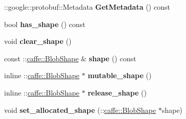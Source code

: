 \begin{DoxyCompactItemize}
\+::google\+::protobuf\+::\+Metadata {\bfseries Get\+Metadata} () const
\item 
\mbox{\label{classcaffe_1_1_parameter_parameter_a061bdee3f3dcfa3fb1695c45480bbbef}} 
bool {\bfseries has\+\_\+shape} () const
\item 
\mbox{\label{classcaffe_1_1_parameter_parameter_a0732b43a97bb38034f17db6d8a6c3378}} 
void {\bfseries clear\+\_\+shape} ()
\item 
\mbox{\label{classcaffe_1_1_parameter_parameter_aa3a342768ff4913b3f99d4795fc58844}} 
const \+::\mbox{\hyperlink{classcaffe_1_1_blob_shape}{caffe\+::\+Blob\+Shape}} \& {\bfseries shape} () const
\item 
\mbox{\label{classcaffe_1_1_parameter_parameter_a7df4cde3b754d59f81d9038a81f1e311}} 
inline \+::\mbox{\hyperlink{classcaffe_1_1_blob_shape}{caffe\+::\+Blob\+Shape}} $\ast$ {\bfseries mutable\+\_\+shape} ()
\item 
\mbox{\label{classcaffe_1_1_parameter_parameter_a971b53f23a854213595fb93dc24db803}} 
inline \+::\mbox{\hyperlink{classcaffe_1_1_blob_shape}{caffe\+::\+Blob\+Shape}} $\ast$ {\bfseries release\+\_\+shape} ()
\item 
\mbox{\label{classcaffe_1_1_parameter_parameter_a8e20e6dff136dcf76b641dc9bb26dc1f}} 
void {\bfseries set\+\_\+allocated\+\_\+shape} (\+::\mbox{\hyperlink{classcaffe_1_1_blob_shape}{caffe\+::\+Blob\+Shape}} $\ast$shape)
\end{DoxyCompactItemize}
